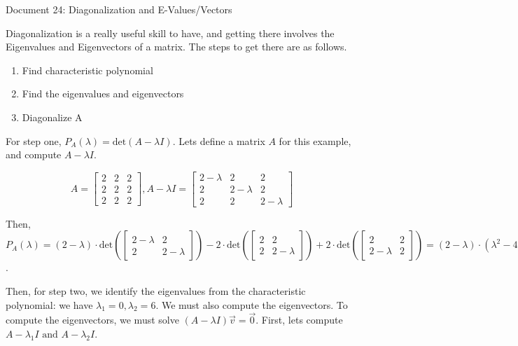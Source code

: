 \documentclass[11pt]{article}
\begin{document}
\begin{center}
Document 24: Diagonalization and E-Values/Vectors
\end{center}

Diagonalization is a really useful skill to have, and getting there involves the Eigenvalues and Eigenvectors of a matrix. The steps to get there are as follows.
\begin{center}\begin{minipage}[t]{0.7\textwidth}\begin{enumerate}
\item Find characteristic polynomial
\item Find the eigenvalues and eigenvectors
\item Diagonalize A\\
\end{enumerate}\end{minipage}\end{center}

For step one, $P_A(\lambda)=\text{det}(A-\lambda I)$. Lets define a matrix $A$ for this example, and compute $A-\lambda I$.

$$A=\begin{bmatrix}2 & 2 & 2\\2 & 2 & 2\\2 & 2 & 2\end{bmatrix},A-\lambda I=\begin{bmatrix}2-\lambda & 2 & 2\\2 & 2-\lambda & 2\\2 & 2 & 2-\lambda\end{bmatrix}$$

Then, $P_A(\lambda)=(2-\lambda)\cdot\text{det}\left(\begin{bmatrix}2-\lambda & 2\\2 & 2-\lambda\end{bmatrix}\right)-2\cdot\text{det}\left(\begin{bmatrix}2 & 2\\2 & 2-\lambda\end{bmatrix}\right)+2\cdot\text{det}\left(\begin{bmatrix}2 & 2\\2-\lambda & 2\end{bmatrix}\right)=(2-\lambda)\cdot(\lambda^2-4\lambda)-2\cdot(-2\lambda)+2\cdot(2\lambda)=6\lambda^2-\lambda^3=-\lambda^2(\lambda-6)$.

Then, for step two, we identify the eigenvalues from the characteristic polynomial: we have $\lambda_1=0,\lambda_2=6$. We must also compute the eigenvectors. To compute the eigenvectors, we must solve $(A-\lambda I)\vec{v}=\vec{0}$. First, lets compute $A-\lambda_1I\text{ and }A-\lambda_2I$.
\end{document}
